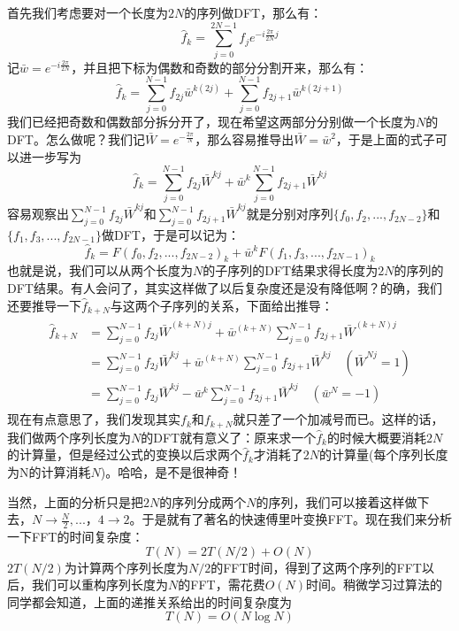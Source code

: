 \documentclass[11pt]{article}
\begin{document}
首先我们考虑要对一个长度为$2N$的序列做DFT，那么有：
\begin{equation}
\hat{f}_k = \sum_{j=0}^{2N-1}f_je^{-i\frac{2\pi}{2N}j}
\end{equation}
记$\bar{w} = e^{-i\frac{2\pi}{2N}}$，并且把下标为偶数和奇数的部分分割开来，那么有：
\begin{equation}
\hat{f}_k = \sum_{j=0}^{N-1}f_{2j}\bar{w}^{k(2j)} + \sum_{j=0}^{N-1}f_{2j+1}\bar{w}^{k(2j+1)}
\end{equation}
我们已经把奇数和偶数部分拆分开了，现在希望这两部分分别做一个长度为$N$的DFT。怎么做呢？我们记$\bar{W}=e^{-\frac{2\pi}{N}}$，那么容易推导出$\bar{W} = \bar{w}^2$，于是上面的式子可以进一步写为
\begin{equation}
\hat{f}_k = \sum_{j=0}^{N-1}f_{2j}\bar{W}^{kj} + \bar{w}^k\sum_{j=0}^{N-1}f_{2j+1}\bar{W}^{kj}
\end{equation}
容易观察出$\sum_{j=0}^{N-1}f_{2j}\bar{W}^{kj}$和$\sum_{j=0}^{N-1}f_{2j+1}\bar{W}^{kj}$就是分别对序列$\{f_0, f_2, ..., f_{2N-2}\}$和$\{f_1, f_3, ..., f_{2N-1}\}$做DFT，于是可以记为：
\begin{equation}
\hat{f}_k = F(f_0, f_2, ..., f_{2N-2})_k + \bar{w}^kF(f_1, f_3, ..., f_{2N-1})_k
\end{equation}
也就是说，我们可以从两个长度为$N$的子序列的DFT结果求得长度为$2N$的序列的DFT结果。有人会问了，其实这样做了以后复杂度还是没有降低啊？的确，我们还要推导一下$\hat{f}_{k+N}$与这两个子序列的关系，下面给出推导：
\begin{align}
\begin{split}
\hat{f}_{k+N} &= \sum_{j=0}^{N-1}f_{2j}\bar{W}^{(k+N)j} + \bar{w}^{(k+N)}\sum_{j=0}^{N-1}f_{2j+1}\bar{W}^{(k+N)j} \\
 &=\sum_{j=0}^{N-1}f_{2j}\bar{W}^{kj} + \bar{w}^{(k+N)}\sum_{j=0}^{N-1}f_{2j+1}\bar{W}^{kj}\quad(\bar{W}^{Nj}=1) \\
 &=\sum_{j=0}^{N-1}f_{2j}\bar{W}^{kj} - \bar{w}^{k}\sum_{j=0}^{N-1}f_{2j+1}\bar{W}^{kj}\quad(\bar{w}^N=-1)
\end{split}
\end{align}
现在有点意思了，我们发现其实$f_k$和$f_{k+N}$就只差了一个加减号而已。这样的话，我们做两个序列长度为$N$的DFT就有意义了：原来求{\color{red}一个}$\hat{f}_{k}$的时候大概要消耗$2N$的计算量，但是经过公式的变换以后求{\color{red}两个}$\hat{f}_k$才消耗了$2N$的计算量(每个序列长度为N的计算消耗$N$)。哈哈，是不是很神奇！

当然，上面的分析只是把$2N$的序列分成两个$N$的序列，我们可以接着这样做下去，$N\to\frac{N}{2}, ...， 4\to2$。于是就有了著名的快速傅里叶变换FFT。现在我们来分析一下FFT的时间复杂度：
\begin{equation}
T(N) = 2T(N/2) + O(N)
\end{equation}
$2T(N/2)$为计算两个序列长度为$N/2$的FFT时间，得到了这两个序列的FFT以后，我们可以重构序列长度为$N$的FFT，需花费$O(N)$时间。稍微学习过算法的同学都会知道，上面的递推关系给出的时间复杂度为
\begin{equation}
T(N) = O(N\log N)
\end{equation}
\end{document}
